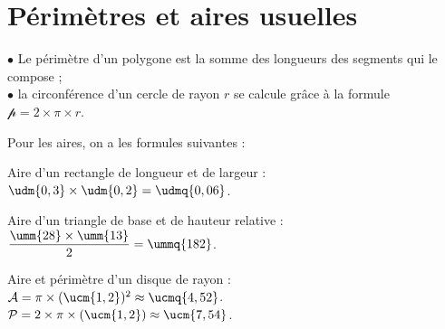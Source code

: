 \section{Périmètres et aires usuelles}

$\bullet$ Le périmètre d'un polygone est la somme des longueurs des segments qui le compose ; \\
$\bullet$ la circonférence d'un cercle de rayon $r$ se calcule grâce à la formule $\mathcal{p} =2\times\pi\times r$. \medskip

Pour les aires, on a les formules suivantes : \\ [-2mm]
\begin{minipage}[t]{5cm}
   \Formule[Aire,Surface=rectangle,Ancre={(2.5,-2)},Couleur=yellow!10]
\end{minipage}
\qquad
\begin{minipage}[t]{5cm}
   \Formule[Aire,Surface=triangle,Ancre={(2.5,-2)},Couleur=yellow!10]
\end{minipage}
\qquad
\begin{minipage}[t]{5cm}
   \Formule[Aire,Surface=disque,Ancre={(2.5,-2)},Couleur=yellow!10]
\end{minipage}

\vspace*{40mm}

\hspace*{-11mm}
\begin{minipage}[t]{5cm}
   \begin{exemple}[1.5]
      Aire d'un rectangle de longueur  et de largeur  : \\ [1mm]
      $\udm{0,3}\times\udm{0,2} =\udmq{0,06}$.
   \end{exemple}
\end{minipage}
\qquad
\begin{minipage}[t]{5cm}
   \begin{exemple}[1.5]
      Aire d'un triangle de base  et de hauteur relative  : \\ [2mm]
   $\dfrac{\umm{28}\times\umm{13}}{2} =\ummq{182}$.
   \end{exemple}
\end{minipage}
\qquad
\begin{minipage}[t]{5cm}
   \begin{exemple}[1.5]
      Aire et périmètre d'un disque de rayon  : \\
      $\mathcal{A} =\pi\times(\ucm{1,2})^2\approx\ucmq{4,52}$. \\
      $\mathcal{P} =2\times\pi\times(\ucm{1,2})\approx\ucm{7,54}$.
   \end{exemple}
\end{minipage}

